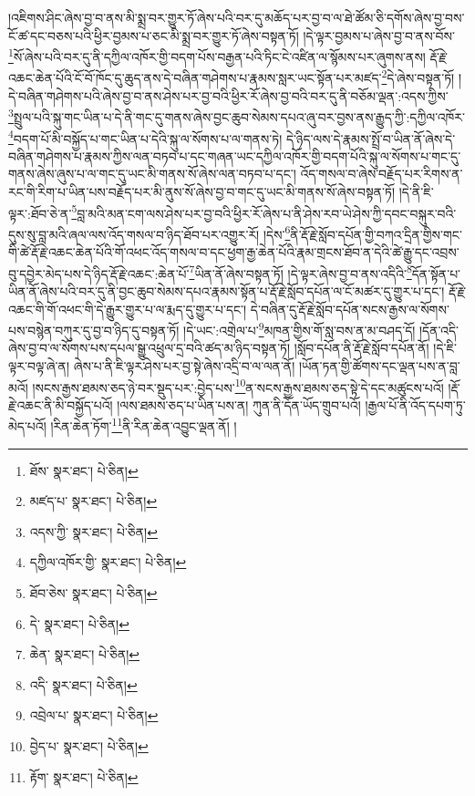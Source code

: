 །འཇིགས་ཤིང་ཞེས་བྱ་བ་ནས་མི་སྨྲ་བར་གྱུར་ཏོ་ཞེས་པའི་བར་དུ་མཆོད་པར་བྱ་བ་ལ་ཐེ་ཚོམ་ཅི་དགོས་ཞེས་བྱ་བས་ངོ་ཚ་དང་བཅས་པའི་ཕྱིར་བྱམས་པ་ཅང་མི་སྨྲ་བར་གྱུར་ཏོ་ཞེས་བསྟན་ཏོ། །དེ་ལྟར་བྱམས་པ་ཞེས་བྱ་བ་ནས་བོས་\footnote{ཐོས་  སྣར་ཐང་།  པེ་ཅིན། }སོ་ཞེས་པའི་བར་དུ་ནི་དཀྱིལ་འཁོར་གྱི་བདག་པོས་བརྒྱན་པའི་ཏིང་ངེ་འཛིན་ལ་སྙོམས་པར་ཞུགས་ནས། རྡོ་རྗེ་འཆང་ཆེན་པོའི་ངོ་བོ་ཁོང་དུ་ཆུད་ནས་དེ་བཞིན་གཤེགས་པ་རྣམས་སླར་ཡང་སྟོན་པར་མཛད་\footnote{མཛད་པ་  སྣར་ཐང་།  པེ་ཅིན། }དེ་ཞེས་བསྟན་ཏོ། །དེ་བཞིན་གཤེགས་པའི་ཞེས་བྱ་བ་ནས་ཤེས་པར་བྱ་བའི་ཕྱིར་རོ་ཞེས་བྱ་བའི་བར་དུ་ནི་བཅོམ་ལྡན་:འདས་ཀྱིས་\footnote{འདས་ཀྱི་  སྣར་ཐང་།  པེ་ཅིན། }སྤྲུལ་པའི་སྐུ་གང་ཡིན་པ་དེ་ནི་གང་དུ་གནས་ཞེས་བྱང་ཆུབ་སེམས་དཔའ་ཞུ་བར་བྱས་ནས་རྒྱུད་ཀྱི་:དཀྱིལ་འཁོར་\footnote{དཀྱིལ་འཁོར་གྱི་  སྣར་ཐང་།  པེ་ཅིན། }བདག་པོ་མི་བསྐྱོད་པ་གང་ཡིན་པ་དེའི་སྐུ་ལ་སོགས་པ་ལ་གནས་ཏེ། དེ་ཉིད་ལས་དེ་རྣམས་སྤྲོ་བ་ཡིན་ནོ་ཞེས་དེ་བཞིན་གཤེགས་པ་རྣམས་ཀྱིས་ལན་བཏབ་པ་དང་གཞན་ཡང་དཀྱིལ་འཁོར་གྱི་བདག་པོའི་སྐུ་ལ་སོགས་པ་གང་དུ་གནས་ཞེས་ཞུས་པ་ལ་གང་དུ་ཡང་མི་གནས་སོ་ཞེས་ལན་བཏབ་པ་དང་། འོད་གསལ་བ་ཞེས་བརྗོད་པར་རིགས་ན་རང་གི་རིག་པ་ཡིན་པས་བརྗོད་པར་མི་ནུས་སོ་ཞེས་བྱ་བ་གང་དུ་ཡང་མི་གནས་སོ་ཞེས་བསྟན་ཏོ། །དེ་ནི་ཇི་ལྟར་:ཐོབ་ཅེ་ན་\footnote{ཐོབ་ཅེས་  སྣར་ཐང་།  པེ་ཅིན། }བླ་མའི་མན་ངག་ལས་ཤེས་པར་བྱ་བའི་ཕྱིར་རོ་ཞེས་པ་ནི་ཤེས་རབ་ཡེ་ཤེས་ཀྱི་དབང་བསྐུར་བའི་དུས་སུ་བླ་མའི་ཞལ་ལས་འོད་གསལ་བ་ཉིད་ཐོབ་པར་འགྱུར་རོ། །དེས་\footnote{དེ་  སྣར་ཐང་།  པེ་ཅིན། }ནི་རྡོ་རྗེ་སློབ་དཔོན་གྱི་བཀའ་དྲིན་གྱིས་གང་གི་ཚེ་རྡོ་རྗེ་འཆང་ཆེན་པོའི་གོ་འཕང་འོད་གསལ་བ་དང་ཕྱག་རྒྱ་ཆེན་པོའི་རྣམ་གྲངས་ཐོབ་ན་དེའི་ཚེ་རྒྱུ་དང་འབྲས་བུ་དབྱེར་མེད་པས་དེ་ཉིད་རྡོ་རྗེ་འཆང་:ཆེན་པོ་\footnote{ཆེན་  སྣར་ཐང་།  པེ་ཅིན། }ཡིན་ནོ་ཞེས་བསྟན་ཏོ། །དེ་ལྟར་ཞེས་བྱ་བ་ནས་འདིའི་\footnote{འདི་  སྣར་ཐང་།  པེ་ཅིན། }དོན་སྟོན་པ་ཡིན་ནོ་ཞེས་པའི་བར་དུ་ནི་བྱང་ཆུབ་སེམས་དཔའ་རྣམས་སྟོན་པ་རྡོ་རྗེ་སློབ་དཔོན་ལ་ངོ་མཚར་དུ་གྱུར་པ་དང་། རྡོ་རྗེ་འཆང་གི་གོ་འཕང་གི་དེ་རྒྱུར་གྱུར་པ་ལ་རྨད་དུ་གྱུར་པ་དང་། དེ་བཞིན་དུ་རྡོ་རྗེ་སློབ་དཔོན་སངས་རྒྱས་ལ་སོགས་པས་བསྙེན་བཀུར་དུ་བྱ་བ་ཉིད་དུ་བསྟན་ཏོ། །དེ་ཡང་:འགྲེལ་པ་\footnote{འབྲེལ་པ་  སྣར་ཐང་།  པེ་ཅིན། }མཁན་གྱིས་གོ་སླ་བས་ན་མ་བཤད་དོ། །དོན་འདི་ཞེས་བྱ་བ་ལ་སོགས་པས་དཔལ་སྒྱུ་འཕྲུལ་དྲ་བའི་ཚད་མ་ཉིད་བསྟན་ཏོ། །སློབ་དཔོན་ནི་རྡོ་རྗེ་སློབ་དཔོན་ནོ། །དེ་ཇི་ལྟར་བལྟ་ཞེ་ན། ཞེས་པ་ནི་ཇི་ལྟར་ཤེས་པར་བྱ་སྟེ་ཞེས་འདྲི་བ་ལ་ལན་ནོ། །ཡོན་ཏན་གྱི་ཚོགས་དང་ལྡན་པས་ན་བླ་མའོ། །སངས་རྒྱས་ཐམས་ཅད་ཉེ་བར་སྡུད་པར་:བྱེད་པས་\footnote{བྱེད་པ་  སྣར་ཐང་།  པེ་ཅིན། }ན་སངས་རྒྱས་ཐམས་ཅད་སྟེ་དེ་དང་མཚུངས་པའོ། །རྡོ་རྗེ་འཆང་ནི་མི་བསྐྱོད་པའོ། །ལས་ཐམས་ཅད་པ་ཡིན་པས་ན། ཀུན་ནི་དོན་ཡོད་གྲུབ་པའོ། །རྒྱལ་པོ་ནི་འོད་དཔག་ཏུ་མེད་པའོ། །རིན་ཆེན་ཏོག་\footnote{རྟོག་  སྣར་ཐང་།  པེ་ཅིན། }ནི་རིན་ཆེན་འབྱུང་ལྡན་ནོ། །
